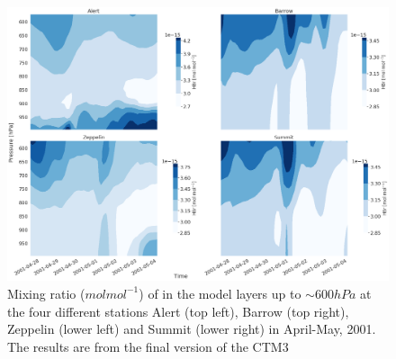 \begin{figure}[ht]
    \centering
    \includegraphics[width = \linewidth]{Chapter6_Results/images/vertHBr_noCl.png}
    \caption{Mixing ratio ($mol mol^{-1}$) of  in the model layers up to $\sim 600 hPa$ at the four different stations Alert (top left), Barrow (top right), Zeppelin (lower left) and Summit (lower right) in April-May, 2001. The results are from the final version of the CTM3}
    \label{fig:vertHBr_step4}
\end{figure}